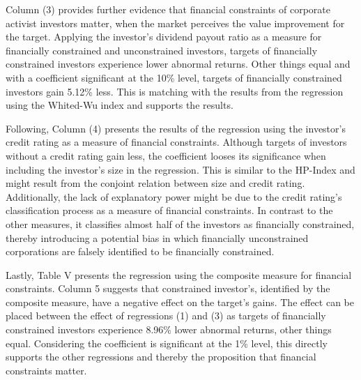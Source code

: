 \documentclass[12pt]{article}
\begin{document}
Column (3) provides further evidence that financial constraints of corporate activist investors matter, when the market perceives the value improvement for the target. Applying the investor's dividend payout ratio as a measure for financially constrained and unconstrained investors, targets of financially constrained investors experience lower abnormal returns. Other things equal and with a coefficient significant at the 10\% level, targets of financially constrained investors gain 5.12\% less. This is matching with the results from the regression using the Whited-Wu index and supports the results. 

Following, Column (4) presents the results of the regression using the investor's credit rating as a measure of financial constraints. Although targets of investors without a credit rating gain less, the coefficient looses its significance when including the investor's size in the regression. This is similar to the HP-Index and might result from the conjoint relation between size and credit rating. Additionally, the lack of explanatory power might be due to the credit rating's classification process as a measure of financial constraints. In contrast to the other measures, it classifies almost half of the investors as financially constrained, thereby introducing a potential bias in which financially unconstrained corporations are falsely identified to be financially constrained.

Lastly, Table V presents the regression using the composite measure for financial constraints. Column 5 suggests that constrained investor's, identified by the composite measure, have a negative effect on the target's gains. The effect can be placed between the effect of regressions (1) and (3) as targets of financially constrained investors experience 8.96\% lower abnormal returns, other things equal. Considering the coefficient is significant at the 1\% level, this directly supports the other regressions and thereby the proposition that financial constraints matter.
\end{document}
